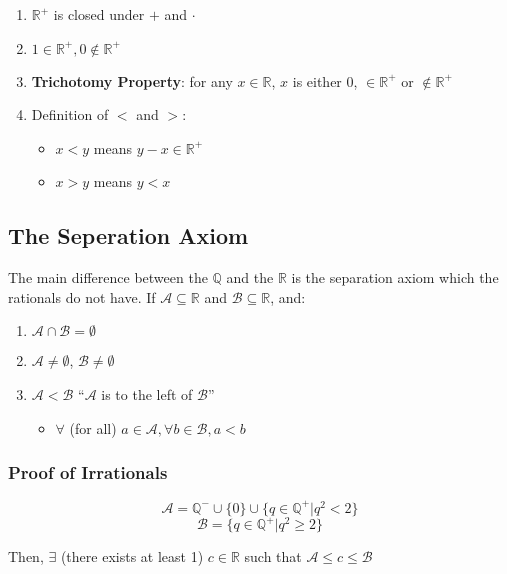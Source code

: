 \documentclass[11 pt, twoside]{article}
\begin{document}
\begin{enumerate}
    \item $\mathbb{R}^+$ is closed under $+$ and $\cdot$
    \item $1 \in \mathbb{R}^+, 0 \notin \mathbb{R}^+$
    \item \textbf{Trichotomy Property}: for any $x \in \mathbb{R}$, $x$ is
        either $0$, $\in \mathbb{R}^+$ or $\notin \mathbb{R}^+$

\item Definition of $<$ and $>$:
\begin{itemize}
    \item $x < y$ means $y - x \in \mathbb{R}^+$
    \item $x > y$ means $y < x$
\end{itemize}
\end{enumerate}

\subsection{The Seperation Axiom}

The main difference between the $\mathbb{Q}$ and the $\mathbb{R}$ is the
separation axiom which the rationals do not have. If $\mathcal{A} \subseteq \mathbb{R}$ and $\mathcal{B} \subseteq \mathbb{R}$, and:

\begin{enumerate}
    \item $\mathcal{A} \cap \mathcal{B} = \emptyset$
    \item $\mathcal{A} \neq \emptyset$, $\mathcal{B} \neq \emptyset$
    \item $\mathcal{A} < \mathcal{B}$ ``$\mathcal{A}$ is to the left of
        $\mathcal{B}$''
    \begin{itemize}
        \item $\forall$ (for all) $a \in \mathcal{A}, \forall b \in \mathcal{B}, a < b$
    \end{itemize}
\end{enumerate}

\subsubsection{Proof of Irrationals}

$$\mathcal{A} = \mathbb{Q}^- \cup \{0\} \cup \{q \in \mathbb{Q}^+ | q^2 < 2\}$$
$$\mathcal{B} = \{q \in \mathbb{Q}^+ | q^2 \geq 2\}$$

Then, $\exists$ (there exists at least 1) $c \in \mathbb{R}$ such that $\mathcal{A} \leq c \leq \mathcal{B}$
\end{document}

